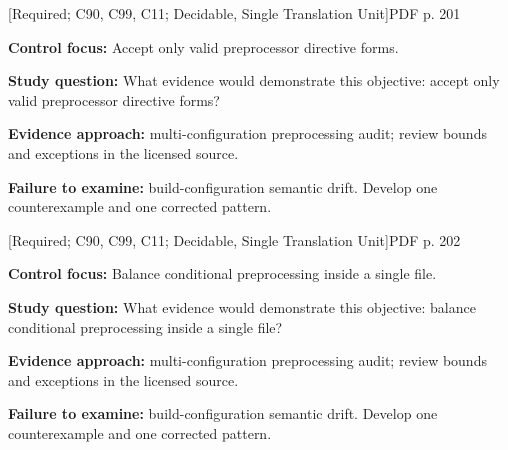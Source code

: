 \documentclass[10pt,letterpaper]{article}
\begin{document}
 \textsf{\footnotesize [Required; C90, C99, C11; Decidable, Single Translation Unit]}\hfill{\footnotesize PDF p. 201}\par
\textbf{Control focus:} Accept only valid preprocessor directive forms.\par
\textbf{Study question:} What evidence would demonstrate this objective: accept only valid preprocessor directive forms?\par
\textbf{Evidence approach:} multi-configuration preprocessing audit; review bounds and exceptions in the licensed source.\par
\textbf{Failure to examine:} build-configuration semantic drift. Develop one counterexample and one corrected pattern.\par
\smallskip
{}
 \textsf{\footnotesize [Required; C90, C99, C11; Decidable, Single Translation Unit]}\hfill{\footnotesize PDF p. 202}\par
\textbf{Control focus:} Balance conditional preprocessing inside a single file.\par
\textbf{Study question:} What evidence would demonstrate this objective: balance conditional preprocessing inside a single file?\par
\textbf{Evidence approach:} multi-configuration preprocessing audit; review bounds and exceptions in the licensed source.\par
\textbf{Failure to examine:} build-configuration semantic drift. Develop one counterexample and one corrected pattern.\par
\smallskip
\end{document}
